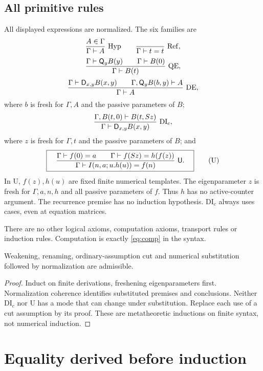 \subsection{All primitive rules}
All displayed expressions are normalized. The six families are
\[
 \frac{A\in\Gamma}{\Gamma\vdash A}\ {\rm Hyp}
 \qquad
 \frac{\ }{\Gamma\vdash t=t}\ {\rm Ref},
\]
\[
 \frac{\Gamma\vdash\mathsf Q_yB(y)\qquad\Gamma\vdash B(0)}
      {\Gamma\vdash B(t)}\ {\rm QE},
\]
\[
 \frac{\Gamma\vdash\mathsf D_{x,y}B(x,y)\qquad
       \Gamma,\mathsf Q_yB(b,y)\vdash A}
      {\Gamma\vdash A}\ {\rm DE},
\]
where $b$ is fresh for $\Gamma,A$ and the passive parameters of $B$;
\[
 \frac{\Gamma,B(t,0)\vdash B(t,Sz)}
      {\Gamma\vdash\mathsf D_{x,y}B(x,y)}\ {\rm DI_c},
\]
where $z$ is fresh for $\Gamma,t$ and the passive parameters of $B$; and
\[
 \boxed{\quad
 \frac{\Gamma\vdash f(0)=a\qquad
       \Gamma\vdash f(Sz)=h(f(z))}
      {\Gamma\vdash I(n,a;u.h(u))=f(n)}\ \mathsf U .
 \quad}                                                \tag{U}\label{eq:U}
\]
In U, $f(z),h(u)$ are fixed finite numerical templates. The eigenparameter
$z$ is fresh for $\Gamma,a,n,h$ and all passive parameters of $f$.
Thus $h$ has no active-counter argument. The recurrence premise has no
induction hypothesis. DI$_c$ always uses cases, even at equation matrices.

There are no other logical axioms, computation axioms, transport rules
or induction rules. Computation is exactly \eqref{eq:comp} in the syntax.

\begin{lemma}
Weakening, renaming, ordinary-assumption cut and numerical substitution
followed by normalization are admissible.
\end{lemma}
\begin{proof}
Induct on finite derivations, freshening eigenparameters first.
Normalization coherence identifies substituted premises and conclusions.
Neither DI$_c$ nor U has a mode that can change under substitution.
Replace each use of a cut assumption by its proof. These are
metatheoretic inductions on finite syntax, not numerical induction.
\end{proof}

\section{Equality derived before induction}\label{sec:equality}
